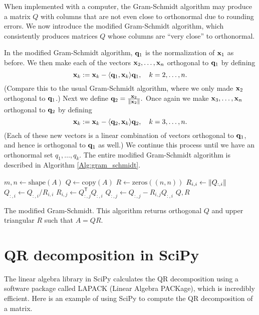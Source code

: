 When implemented with a computer, the Gram-Schmidt algorithm may produce a matrix $Q$ with columns that are not even close to orthonormal due to rounding errors. 
We now introduce the modified Gram-Schmidt algorithm, which consistently produces matrices $Q$ whose columns are ``very close'' to orthonormal.

In the modified Gram-Schmidt algorithm, ${\bf q}_1$ is the normalization of ${\bf x}_1$ as before. 
We then make each of the vectors ${\bf x}_2, \ldots, {\bf x}_n$ orthogonal to ${\bf q}_1$ by defining
\[
{\bf x}_k := {\bf x}_k - \langle {\bf q}_1,{\bf x}_{k} \rangle {\bf q}_1,\quad k=2,\ldots,n.
\]
(Compare this to the usual Gram-Schmidt algorithm, where we only made ${\bf x}_2$ orthogonal to ${\bf q}_1$.) 
Next we define ${\bf q}_2 = \frac{{\bf x}_2}{\|{\bf x}_2\|}.$ Once again we make ${\bf x}_3, \ldots, {\bf x}_n$ orthogonal to ${\bf q}_2$ by defining
\[
{\bf x}_k := {\bf x}_k - \langle {\bf q}_2,{\bf x}_{k} \rangle {\bf q}_2,\quad k=3,\ldots,n.
\]
(Each of these new vectors is a linear combination of vectors orthogonal to ${\bf q}_1$, and hence is orthogonal to ${\bf q}_1$ as well.) 
We continue this process until we have an orthonormal set $q_1, \ldots, q_k$. 
The entire modified Gram-Schmidt algorithm is described in Algorithm \ref{Alg:gram_schmidt}.

\begin{algorithm}
\begin{algorithmic}[1]
\State $m, n \gets \text{shape} \left( A \right)$
\State $Q \gets \text{copy} \left( A \right)$
\State $R \gets \text{zeros}((n,n))$
    \State $R_{i,i} \gets \left\lVert Q_{:,i}\right\rVert$
    \State $Q_{:,i} \gets Q_{:,i}/R_{i,i}$
        \State $R_{i,j} \gets Q_{:,j}^\mathsf{T}Q_{:,i}$
        \State $Q_{:,j} \gets Q_{:,j}-R_{i,j}Q_{:,i}$
	\EndFor
\EndFor
\State {} $Q, R$
\EndProcedure
\end{algorithmic}
\caption{The modified Gram-Schmidt. This algorithm returns orthogonal $Q$ and upper triangular $R$ such that $A = QR$.}
\label{Alg:gram_schmidt}
\end{algorithm}


\section*{QR decomposition in SciPy}
The linear algebra library in SciPy calculates the QR decomposition using a software package called LAPACK (Linear Algebra PACKage), which is incredibly efficient.
Here is an example of using SciPy to compute the QR decomposition of a matrix.

